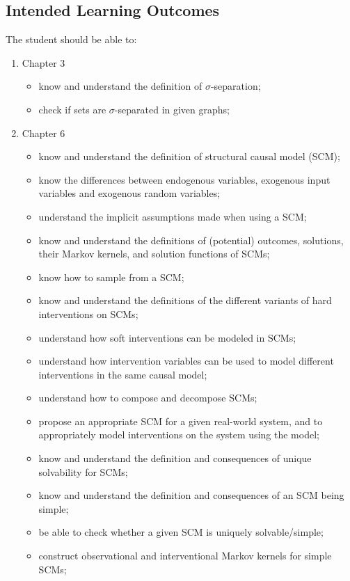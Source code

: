 \subsection*{Intended Learning Outcomes}

The student should be able to:
\begin{enumerate}
  \item Chapter 3
    \begin{itemize}
      \item know and understand the definition of $\sigma$-separation;
      \item check if sets are $\sigma$-separated in given graphs;
    \end{itemize}
  \item Chapter 6
    \begin{itemize}
    \item know and understand the definition of structural causal model (SCM);
    \item know the differences between endogenous variables, exogenous input variables and exogenous random variables;
    \item understand the implicit assumptions made when using a SCM;
    \item know and understand the definitions of (potential) outcomes, solutions, their Markov kernels, and solution functions of SCMs;
    \item know how to sample from a SCM;
    \item know and understand the definitions of the different variants of hard interventions on SCMs;
    \item understand how soft interventions can be modeled in SCMs;
    \item understand how intervention variables can be used to model different interventions in the same causal model;
    \item understand how to compose and decompose SCMs;
    \item propose an appropriate SCM for a given real-world system, and to appropriately model interventions on the system using the model;
    \item know and understand the definition and consequences of unique solvability for SCMs;
    \item know and understand the definition and consequences of an SCM being simple;
    \item be able to check whether a given SCM is uniquely solvable/simple;
    \item construct observational and interventional Markov kernels for simple SCMs;

\end{itemize}
\end{enumerate}
